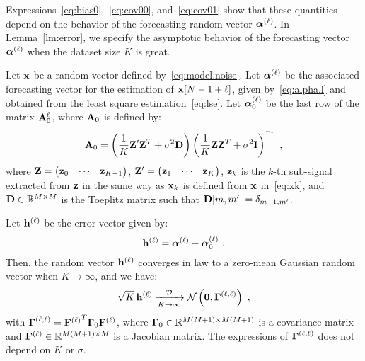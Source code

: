 Expressions~\eqref{eq:bias0},~\eqref{eq:cov00}, and~\eqref{eq:cov01} show that these quantities depend on the behavior of the forecasting random vector $\boldsymbol{\alpha}^{(\ell)}$. In Lemma~\ref{lm:error}, we specify the asymptotic behavior of the forecasting vector $\boldsymbol{\alpha}^{(\ell)}$ when the dataset size $K$ is great.
\begin{lemma}
\label{lm:error}
Let ${\mathbf x}$ be a random vector defined by~\eqref{eq:model.noise}. Let $\boldsymbol{\alpha}^{(\ell)}$ be the associated forecasting vector for the estimation of ${\mathbf x}[N-1+\ell]$, given by~\eqref{eq:alpha.l} and obtained from the least square estimation~\eqref{eq:lse}. Let $\boldsymbol{\alpha}_0^{(\ell)}$ be the last row of the matrix ${\mathbf A}_0^\ell$, where ${\mathbf A}_0$ is defined by:
\begin{equation}
\bA_0 = \left(\dfrac1K\bZ'\bZ^T+\sigma^2\bD\right)\left(\dfrac1K\bZ\bZ^T+\sigma^2\bI\right)^{\inv}\ ,
\label{eq:lse.0}
\end{equation}
where ${\mathbf Z}=\begin{pmatrix} {\mathbf z}_0 & \cdots & {\mathbf z}_{K-1}\end{pmatrix}$, ${\mathbf Z}'=\begin{pmatrix} {\mathbf z}_1 & \cdots & {\mathbf z}_{K}\end{pmatrix}$, ${\mathbf z}_k$ is the $k$-th sub-signal extracted from ${\mathbf z}$ in the same way as ${\mathbf x}_k$ is defined from ${\mathbf x}$ in~\eqref{eq:xk}, and ${\mathbf D}\in{\mathbb R}^{M\times M}$ is the Toeplitz matrix such that ${\mathbf D}[m,m'] = \delta_{m+1,m'}$.

Let ${\mathbf h}^{(\ell)}$ be the error vector given by:
\begin{equation*}
{\mathbf h}^{(\ell)} = \boldsymbol{\alpha}^{(\ell)} - \boldsymbol{\alpha}_0^{(\ell)}\ .
\end{equation*}
Then, the random vector ${\mathbf h}^{(\ell)}$ converges in law to a zero-mean Gaussian random vector when $K\to\infty$, and we have:
\begin{equation}
\sqrt{K}\,{\mathbf h}^{(\ell)}  \xrightarrow[K\to\infty]{{\mathcal D}} {\mathcal N}\left(\boldsymbol{0},\boldsymbol{\Gamma}^{(\ell,\ell)}\right)\ ,
\end{equation}
with $\boldsymbol{\Gamma}^{(\ell,\ell)}={{\mathbf F}^{(\ell)}}^T\boldsymbol{\Gamma}_0{\mathbf F}^{(\ell)}$, where $\boldsymbol{\Gamma}_0\in{\mathbb R}^{M(M+1)\times M(M+1)}$ is a covariance matrix and ${\mathbf F}^{(\ell)}\in{\mathbb R}^{M(M+1)\times M}$ is a Jacobian matrix. The expressions of $\boldsymbol{\Gamma}^{(\ell,\ell)}$ does not depend on $K$ or $\sigma$. 
\end{lemma}

